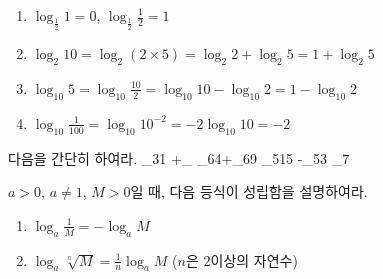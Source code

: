\documentclass[11pt, a4paper]{book}
\begin{document}
\begin{sample}
	\begin{enumerate}[label=(\arabic*)]
		\item $\log_{\frac{1}{2}}1 =0$, $\log_{\frac{1}{2}}\frac{1}{2}= 1$
		\item $\log_{2}10 =\log_{2}(2\times 5)=\log_{2}2 +\log_{2}5 = 1 +\log_{2}5$
		\item $\log_{10}5 =\log_{10}\frac{10}{2}=\log_{10}10 -\log_{10}2 = 1 -\log_{10}2$
		\item $\log_{10}\frac{1}{100}=\log_{10}10^{-2}= -2\log_{10}10=-2$
	\end{enumerate}
\end{sample}
\begin{problem}
	 다음을 간단히 하여라.
	\quesfour
	{ \log_{3}1 +\log_{}}
	{\log_{6}4+\log_{6}9}
	{\log_{5}15 -\log_{5}3}
	{\log_{7}}
\end{problem}
\begin{problem}
	 $a>0$, $a \ne1$, $M>0$일 때, 다음 등식이 성립함을 설명하여라.
	 \begin{enumerate}[label=(\arabic*)]
	 	\item $\log_{a}\frac{1}{M}=-\log_{a}M$
	 	\item $\log_{a}\sqrt[n]{M}=\frac{1}{n}\log_{a}M$ ($n$은 $2$이상의 자연수)
	 \end{enumerate}
\end{problem}
\end{document}
